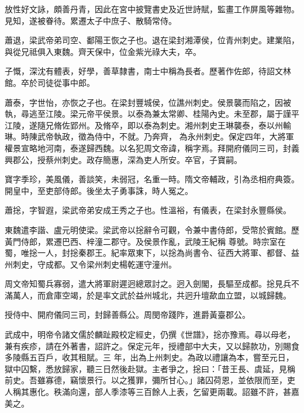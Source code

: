 \begin{pinyinscope}
 放性好文詠，頗善丹青，因此在宮中披覽書史及近世詩賦，監畫工作屏風等雜物。見知，遂被眷待。累遷太子中庶子、散騎常侍。



 蕭退，梁武帝弟司空、鄱陽王恢之子也。退在梁封湘潭侯，位青州刺史。建業陷，與從兄祗俱入東魏。齊天保中，位金紫光祿大夫，卒。



 子慨，深沈有體表，好學，善草隸書，南士中稱為長者。歷著作佐郎，待詔文林館。卒於司徒從事中郎。



 蕭泰，字世怡，亦恢之子也。在梁封豐城侯，位譙州刺史。侯景襲而陷之，因被執，尋逃至江陵。梁元帝平侯景。以泰為兼太常卿、桂陽內史。未至郡，屬于謹平江陵，遂隨兄脩佐郢州。及脩卒，即以泰為刺史。湘州刺史王琳襲泰，泰以州輸琳。時陳武帝執政，徵為侍中，不就。乃奔齊，
 為永州刺史。保定四年，大將軍權景宣略地河南，泰遂歸西魏。以名犯周文帝諱，稱字焉。拜開府儀同三司，封義興郡公，授蔡州刺史。政存簡惠，深為吏人所安。卒官，子寶嗣。



 寶字季珍，美風儀，善談笑，未弱冠，名重一時。隋文帝輔政，引為丞相府典簽。開皇中，至吏部侍郎。後坐太子勇事誅，時人冤之。



 蕭捴，字智遐，梁武帝弟安成王秀之子也。性溫裕，有儀表，在梁封永豐縣侯。



 東魏遣李諧、盧元明使梁。梁武帝以捴辭令可觀，令兼中書侍郎，受幣於賓館。歷黃門侍郎，累遷巴西、梓潼二郡守。及侯景作亂，武陵王紀稱
 尊號。時宗室在蜀，唯捴一人，封捴秦郡王。紀率眾東下，以捴為尚書令、征西大將軍、都督、益州刺史，守成都。又令梁州刺史楊乾運守潼州。



 周文帝知蜀兵寡弱，遣大將軍尉遲迥總眾討之。迥入劍閣，長驅至成都。捴見兵不滿萬人，而倉庫空竭，於是率文武於益州城北，共迥升壇歃血立盟，以城歸魏。



 授侍中、開府儀同三司，封歸善縣公。周閔帝踐阼，進爵黃臺郡公。



 武成中，明帝令諸文儒於麟趾殿校定經史，仍撰《世譜》，捴亦豫焉。尋以母老，兼有疾疹，請在外著書，詔許之。保定元年，授禮部中大夫，又以歸款功，別賜食多陵縣五百戶，收其租賦。三
 年，出為上州刺史。為政以禮讓為本，嘗至元日，獄中囚繫，悉放歸家，聽三日然後赴獄。主者爭之，捴曰：「昔王長、虞延，見稱前史。吾雖寡德，竊懷景行。以之獲罪，彌所甘心。」諸囚荷恩，並依限而至，吏人稱其惠化。秩滿向還，部人季漆等三百餘人上表，乞留更兩載。詔雖不許，甚嘉美之。




\end{pinyinscope}

